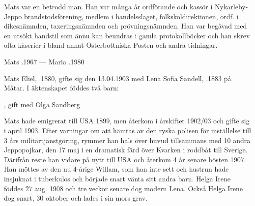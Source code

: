 Mats var en betrodd man. Han var många år ordförande och kassör i Nykarleby-Jeppo brandstodsförening, medlem i handelsslaget, folkskoldirektionen, ordf. i dikesnämnden, taxeringsnämnden och prövningsnämnden. Han var begåvad med en utsökt handstil som ännu kan beundras i gamla protokollböcker och han skrev ofta kåserier i bland annat Österbottniska Posten och andra tidningar.
\begin{jhchildren}
  \item {}
  \item {}
  \item {}
  \item {}
  \item {}
  \item {}
  \item {}
  \item {}
  \item {}
\end{jhchildren}

Mats .1967  ---  Maria .1980


%
Mats Eliel, .1880, gifte sig den 13.04.1903 med Lena Sofia Sandell, .1883 på Måtar. I äktenskapet föddes två barn:
\begin{jhchildren}
  \item {}, gift med Olga Sandberg
  \item {}
\end{jhchildren}

Mats hade emigrerat till USA 1899, men återkom i årskiftet 1902/03 och gifte sig i april 1903. Efter varningar om att hämtas av den ryska polisen för inställelse till 3 års militärtjänstgöring, rymmer han hals över huvud tillsammans med 10 andra Jeppopojkar, den 17 maj i en dramatisk färd över Kvarken i roddbåt till Sverige. Därifrån reste han vidare på nytt till USA och återkom 4 år senare hösten 1907. Han möttes av den nu 4-årige Willam, som han inte sett och  hustrun hade insjuknat i tuberkulos och började snart vänta sitt andra barn. Helga Irene föddes 27 aug. 1908 och tre veckor senare dog modern Lena. Också Helga Irene dog snart, 30 oktober och lades i sin mors grav.

